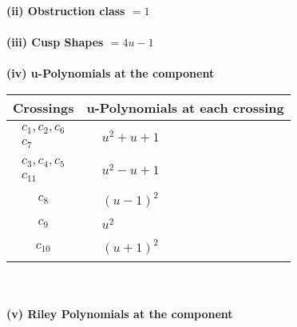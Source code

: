 \documentclass[1p]{elsarticle_modified}
\theoremstyle{definition}
\begin{document}
\flushleft \textbf{(ii) Obstruction class $= 1$}\\~\\
\flushleft \textbf{(iii) Cusp Shapes $= 4 u-1$}\\~\\
\newpage\renewcommand{\arraystretch}{1}
\flushleft \textbf{(iv) u-Polynomials at the component}\newline \\
\begin{tabular}{m{50pt}|m{274pt}}
Crossings & \hspace{64pt}u-Polynomials at each crossing \\
\hline $$\begin{aligned}c_{1},c_{2},c_{6}\\c_{7}\end{aligned}$$&$\begin{aligned}
&u^2+u+1
\end{aligned}$\\
\hline $$\begin{aligned}c_{3},c_{4},c_{5}\\c_{11}\end{aligned}$$&$\begin{aligned}
&u^2- u+1
\end{aligned}$\\
\hline $$\begin{aligned}c_{8}\end{aligned}$$&$\begin{aligned}
&(u-1)^2
\end{aligned}$\\
\hline $$\begin{aligned}c_{9}\end{aligned}$$&$\begin{aligned}
&u^2
\end{aligned}$\\
\hline $$\begin{aligned}c_{10}\end{aligned}$$&$\begin{aligned}
&(u+1)^2
\end{aligned}$\\
\hline
\end{tabular}\\~\\
\newpage\renewcommand{\arraystretch}{1}
\flushleft \textbf{(v) Riley Polynomials at the component}\newline \\
\end{document}
